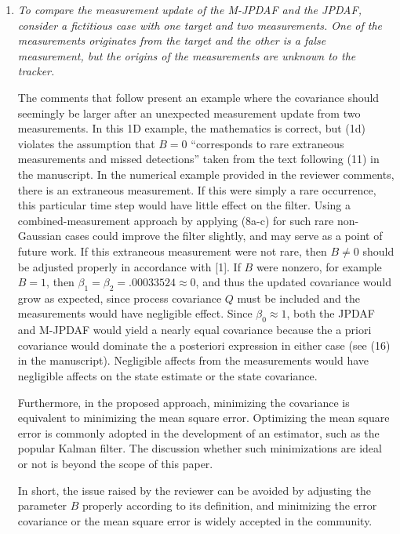 \documentclass[11pt]{article}
\begin{document}
\begin{itemize}


\begin{enumerate}


\item {\itshape To compare the measurement update of the M-JPDAF and the JPDAF, consider a fictitious case with one target and two measurements. One of the measurements originates from the target and the other is a false measurement, but the origins of the measurements are unknown to the tracker.}


The comments that follow present an example where the covariance should seemingly be larger after an unexpected measurement update from two measurements.
In this 1D example, the mathematics is correct, but (1d) violates the assumption that $B=0$ ``corresponds to rare extraneous measurements and missed detections'' taken from the text following (11) in the manuscript. In the numerical example provided in the reviewer comments, there is an extraneous measurement. If this were simply a rare occurrence, this particular time step would have little effect on the filter. Using a combined-measurement approach by applying (8a-c) for such rare non-Gaussian cases could improve the filter slightly, and may serve as a point of future work.
If this extraneous measurement were not rare, then $B\neq0$ should be adjusted properly in accordance with [1].
If $B$ were nonzero, for example $B=1$, then $\beta_1=\beta_2=.00033524\approx0$, and thus the updated covariance would grow as expected, since process covariance $Q$ must be included and the measurements would have negligible effect. Since $\beta_0\approx1$, both the JPDAF and M-JPDAF would yield a nearly equal covariance because the a priori covariance would dominate the a posteriori expression in either case (see (16) in the manuscript). Negligible affects from the measurements would have negligible affects on the state estimate or the state covariance.

Furthermore, in the proposed approach, minimizing the covariance is equivalent to minimizing the mean square error. Optimizing the mean square error is commonly adopted in the development of an estimator, such as the popular Kalman filter. The discussion whether such minimizations are ideal or not is beyond the scope of this paper. 

In short, the issue raised by the reviewer can be avoided by adjusting the parameter $B$ properly according to its definition, and minimizing the error covariance or the mean square error is widely accepted in the community. 


\end{enumerate}
\end{itemize}
\end{document}
